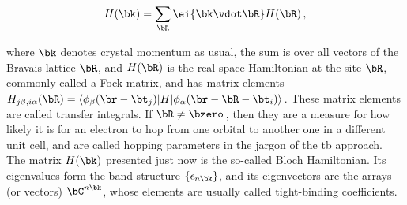 \begin{equation}
    \label{eq:Bloch_Hamiltonian_definition}
    H(\bk) = \sum_{\bR} \ei{\bk \vdot \bR} H(\bR) \,,
\end{equation}

\noindent where $\bk$ denotes crystal momentum as usual, the sum is over all vectors of the Bravais lattice $\bR$, and $H(\bR)$ is the real space Hamiltonian at the site $\bR$, commonly called a Fock matrix, and has matrix elements $H_{j \beta, i \alpha} (\bR) = \langle \phi_{\beta} (\br - \bt_j) | H | \phi_{\alpha} (\br - \bR - \bt_i) \rangle$\,.
These matrix elements are called transfer integrals.
If $\bR \neq \bzero$\,, then they are a measure for how likely it is for an electron to hop from one orbital to another one in a different unit cell, and are called hopping parameters in the jargon of the \gls{tb} approach.
The matrix $H(\bk)$ presented just now is the so-called Bloch Hamiltonian.
Its eigenvalues form the band structure $\{\epsilon_{n \bk}\}$, and its eigenvectors are the arrays (or vectors) $\bC^{n \bk}$, whose elements are usually called tight-binding coefficients.

